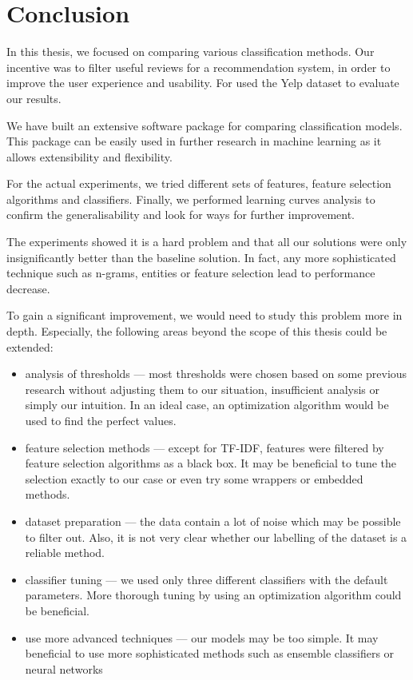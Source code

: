 \chapter*{Conclusion}\label{chap:concl}

In this thesis, we focused on comparing various classification methods.
Our incentive was to filter useful reviews for a recommendation system,
in order to improve the user experience and usability.
For used the Yelp dataset to evaluate our results.

We have built an extensive software package for comparing classification models.
This package can be easily used in further research in machine learning 
as it allows extensibility and flexibility.

For the actual experiments, we tried different sets of features, feature selection algorithms and
classifiers.
Finally, we performed learning curves analysis to confirm the generalisability and look for
ways for further improvement.

The experiments showed it is a hard problem 
and that all our solutions were only insignificantly better than the baseline solution.
In fact, any more sophisticated technique such as n-grams, entities or feature selection
lead to performance decrease.

To gain a significant improvement, we would need to study this problem more in depth.
Especially, the following areas beyond the scope of this thesis could be extended:

\begin{itemize}

\item analysis of thresholds ---
most thresholds were chosen based on some previous research without adjusting them to our situation, insufficient analysis or simply our intuition.
In an ideal case, an optimization algorithm would be used to find the perfect values.

\item feature selection methods ---
except for TF-IDF, features were filtered by feature selection algorithms as a black box.
It may be beneficial to tune the selection exactly to our case or even try some wrappers or embedded methods.

\item dataset preparation ---
the data contain a lot of noise which may be possible to filter out.
Also, it is not very clear whether our labelling of the dataset is a reliable method.

\item classifier tuning ---
we used only three different classifiers with the default parameters.
More thorough tuning by using an optimization algorithm could be beneficial.

\item use more advanced techniques ---
our models may be too simple.
It may beneficial to use more sophisticated methods
such as ensemble classifiers or neural networks
 
\end{itemize}
